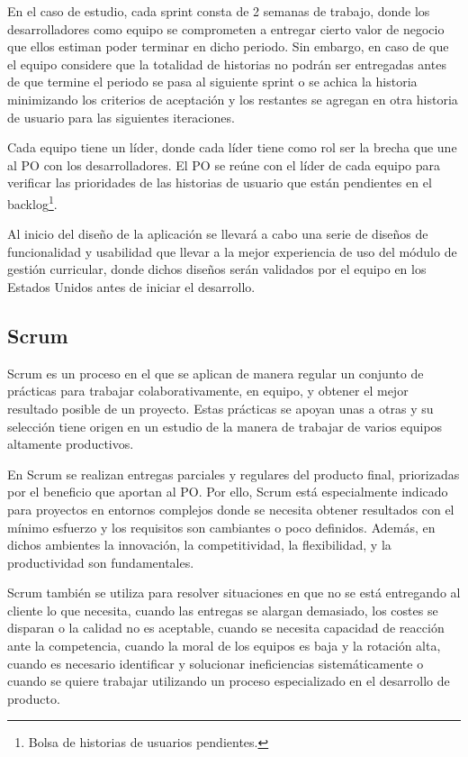 En el caso de estudio, cada sprint consta de 2 semanas de trabajo, donde los desarrolladores como equipo se comprometen a entregar cierto valor de negocio que ellos estiman poder terminar en dicho periodo. Sin embargo, en caso de que el equipo considere que la totalidad de historias no podrán ser entregadas antes de que termine el periodo se pasa al siguiente sprint o se achica la historia minimizando los criterios de aceptación y los restantes se agregan en otra historia de usuario para las siguientes iteraciones.

Cada equipo tiene un líder, donde cada líder tiene como rol ser la brecha que une al PO con los desarrolladores. El PO se reúne con el líder de cada equipo para verificar las prioridades de las historias de usuario que están pendientes en el backlog\footnote{Bolsa de historias de usuarios pendientes.}. 

Al inicio del diseño de la aplicación se llevará a cabo una serie de diseños de funcionalidad y usabilidad que llevar a la mejor experiencia de uso del módulo de gestión curricular, donde dichos diseños serán validados por el equipo en los Estados Unidos antes de iniciar el desarrollo.

\subsection{Scrum}
Scrum es un proceso en el que se aplican de manera regular un conjunto de prácticas para trabajar colaborativamente, en equipo, y obtener el mejor resultado posible de un proyecto. Estas prácticas se apoyan unas a otras y su selección tiene origen en un estudio de la manera de trabajar de varios equipos altamente productivos.

En Scrum se realizan entregas parciales y regulares del producto final, priorizadas por el beneficio que aportan al PO. Por ello, Scrum está especialmente indicado para proyectos en entornos complejos donde se necesita obtener resultados con el mínimo esfuerzo y los requisitos son cambiantes o poco definidos. Además, en dichos ambientes la innovación, la competitividad, la flexibilidad, y la productividad son fundamentales.

Scrum también se utiliza para resolver situaciones en que no se está entregando al cliente lo que necesita, cuando las entregas se alargan demasiado, los costes se disparan o la calidad no es aceptable, cuando se necesita capacidad de reacción ante la competencia, cuando la moral de los equipos es baja y la rotación alta, cuando es necesario identificar y solucionar ineficiencias sistemáticamente o cuando se quiere trabajar utilizando un proceso especializado en el desarrollo de producto. 

